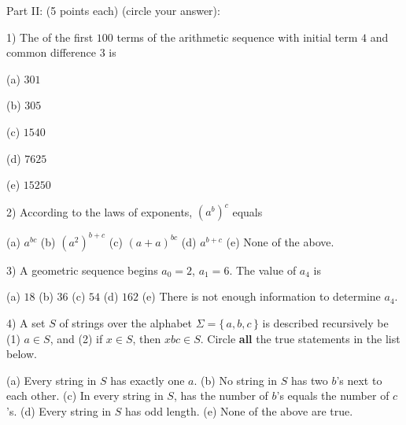 \documentclass[11pt]{amsart}
\begin{document}
 
 
 
 \begin{center}
Part II: (5 points each)  (circle your answer):
\end{center}

\vskip 20pt

1) The  of the first $100$ terms of the arithmetic sequence with initial term $4$
and common 
\vskip -1pt\hskip 13pt difference $3$ is

\hskip 20pt (a) $301$\hfill

\hskip 20pt (b) $305$\hfill

\hskip 20pt (c) $1540$\hfill

\hskip 20pt (d) $7625$\hfill

\hskip 20pt {\color{red} (e) $15250$}\hfill

\vfill


2) According to the laws of exponents, $(a^b)^c$ equals

\vskip 5pt
\hskip 20pt {\color{red}(a) $a^{bc}$}\hfill
\vskip 5pt
\hskip 20pt (b) $(a^2)^{b+c}$\hfill
\vskip 5pt
\hskip 20pt (c) $(a+a)^{bc}$\hfill
\vskip 5pt
\hskip 20pt (d) $a^{b+c}$\hfill
\vskip 5pt
\hskip 20pt (e) None of the above.\hfill

\vfill

3)  A geometric sequence begins $a_0 = 2$, $a_1=6$. The value of $a_4$ is

\vskip 5pt
\hskip 20pt (a) $18$\hfill
\vskip 5pt
\hskip 20pt (b) $36$\hfill
\vskip 5pt
\hskip 20pt (c) $54$\hfill
\vskip 5pt
\hskip 20pt {\color{red} (d) $162$}\hfill
\vskip 5pt
\hskip 20pt (e) There is not enough information to determine $a_4$.\hfill

 
\vfill


4) A set $S$ of strings over the alphabet $\Sigma = \{\,a,b,c\,\}$ is described
recursively be (1) $a\in S$,
\vskip -1pt\hskip 13pt and (2) if $x\in S$, then $xbc\in S$.
Circle {\bfseries all} the true statements in the list below.

\vskip 5pt
\hskip 20pt {\color{red} (a) Every string in $S$ has exactly one $a$.}\hfill
\vskip 5pt
\hskip 20pt {\color{red} (b) No string in $S$ has two $b$'s next to each other.}\hfill
\vskip 5pt
\hskip 20pt {\color{red} (c) In every string in $S$, has the number of $b$'s equals the number of  $c$'s.}\hfill
\vskip 5pt
\hskip 20pt {\color{red} (d) Every string in $S$ has odd length.}\hfill
\vskip 5pt
\hskip 20pt (e) None of the above are true.\hfill

\vfill
\break
\end{document}
